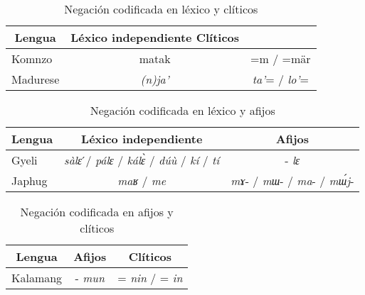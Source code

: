 \begin{table}[htbp]
\centering
\begin{tabular}{lcc}
\multicolumn{1}{c}{\textbf{Lengua}} & \textbf{Léxico independiente} \textbf{Clíticos} \\
\hline
Komnzo & matak & =m / =mär \\
Madurese & {\setmainfont{Charis SIL} \textit{(n)ja’}}  & {\setmainfont{Charis SIL} \textit{ta’}}= / {\setmainfont{Charis SIL} \textit{lo’}}= \\
\hline
\end{tabular}
\caption{Negación codificada en léxico y clíticos}
\label{cuadro16}
\end{table}

\begin{table}[htbp]
\centering
\begin{tabular}{lcc}
\multicolumn{1}{c}{\textbf{Lengua}} & \textbf{Léxico independiente} & \textbf{Afijos} \\
\hline
Gyeli & {\setmainfont{Charis SIL} \textit{sàlɛ}} ́/ {\setmainfont{Charis SIL} \textit{pálɛ}} / {\setmainfont{Charis SIL} \textit{kálɛ̀}} / {\setmainfont{Charis SIL} \textit{dúù}} / {\setmainfont{Charis SIL} \textit{kí}} / {\setmainfont{Charis SIL} \textit{tí}} & -{\setmainfont{Charis SIL} \textit{lɛ}} \\
Japhug & {\setmainfont{Charis SIL} \textit{maʁ}} / {\setmainfont{Charis SIL} \textit{me}} & {\setmainfont{Charis SIL} \textit{mɤ}}- / {\setmainfont{Charis SIL} \textit{mɯ}}- / {\setmainfont{Charis SIL} \textit{ma}}- / {\setmainfont{Charis SIL} \textit{mɯ́j}}- \\
\hline
\end{tabular}
\caption{Negación codificada en léxico y afijos}
\label{cuadro17}
\end{table}

\begin{table}[htbp]
\centering
\begin{tabular}{lcc}
\multicolumn{1}{c}{\textbf{Lengua}} & \textbf{Afijos} & \textbf{Clíticos} \\
\hline
Kalamang & -{\setmainfont{Charis SIL} \textit{mun}}  & ={\setmainfont{Charis SIL} \textit{nin}} / ={\setmainfont{Charis SIL} \textit{in}} \\
\hline
\end{tabular}
\caption{Negación codificada en afijos y clíticos}
\label{cuadro18}
\end{table}